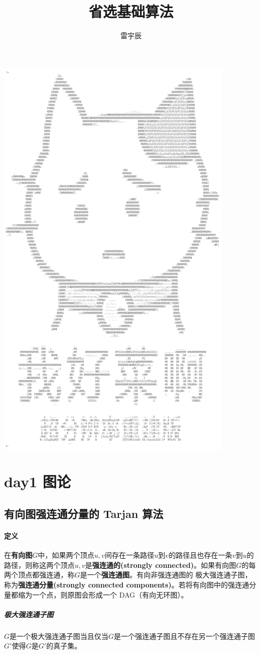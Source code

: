 \documentclass[]{cpp}
\title{省选基础算法}
\author{雷宇辰}
\begin{document}
\setcounter{page}{0}
\maketitle
\begin{center}\includegraphics[height=20cm]{assets/banner.png}\end{center}
\newpage
\tableofcontents
\newpage
\setcounter{page}{1}
\section{day1 图论}
\subsection{有向图强连通分量的 Tarjan 算法}
\paragraph{定义}
	在\textbf{有向图$G$}中，如果两个顶点$u,v$间存在一条路径$u$到$v$的路径且也存在一条$v$到$u$的路径，则称这两个顶点$u,v$是\textbf{强连通的(strongly connected)}。如果有向图$G$的每两个顶点都强连通，称$G$是一个\textbf{强连通图}。有向非强连通图的 极大强连通子图，称为\textbf{强连通分量(strongly connected components)}。若将有向图中的强连通分量都缩为一个点，则原图会形成一个 DAG（有向无环图）。
\subparagraph{极大强连通子图}
	$G$是一个极大强连通子图当且仅当$G$是一个强连通子图且不存在另一个强连通子图$G'$使得$G$是$G'$的真子集。
\end{document}
